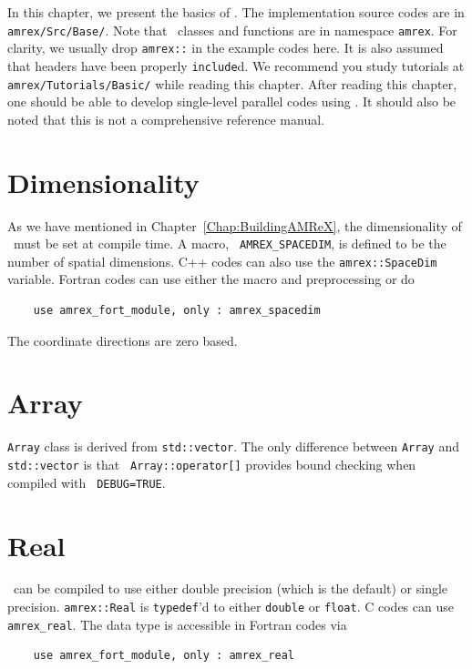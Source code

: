 In this chapter, we present the basics of \amrex.  The implementation
source codes are in {\tt amrex/Src/Base/}.  Note that \amrex\ classes
and functions are in namespace {\tt amrex}.  For clarity, we usually
drop {\tt amrex::} in the example codes here.  It is also assumed that
headers have been properly {\tt include}d.  We recommend you study
tutorials at {\tt amrex/Tutorials/Basic/} while reading this chapter.
After reading this chapter, one should be able to develop single-level
parallel codes using \amrex.  It should also be noted that this is not
a comprehensive reference manual.

\section{Dimensionality}
\label{sec:basics:dim}

As we have mentioned in Chapter~\ref{Chap:BuildingAMReX}, the
dimensionality of \amrex\ must be set at compile time.  A macro, {\tt
  AMREX\_SPACEDIM}, is defined to be the number of spatial
dimensions.  C++ codes can also use the {\tt amrex::SpaceDim}
variable.  Fortran codes can use either the macro and preprocessing or
do 
\begin{verbatim}
    use amrex_fort_module, only : amrex_spacedim
\end{verbatim}
The coordinate directions are zero based. 

\section{Array}

{\tt Array} class is derived from {\tt std::vector}.  The only
difference between {\tt Array} and {\tt std::vector} is that {\tt
  Array::operator[]} provides bound checking when compiled with {\tt
  DEBUG=TRUE}. 

\section{Real}

\amrex\ can be compiled to use either double precision (which is the
default) or single precision.  {\tt amrex::Real} is {\tt typedef}'d to
either {\tt double} or {\tt float}.  C codes can use {\tt
  amrex\_real}.  The data type is accessible in Fortran codes via
\begin{verbatim}
    use amrex_fort_module, only : amrex_real
\end{verbatim}

